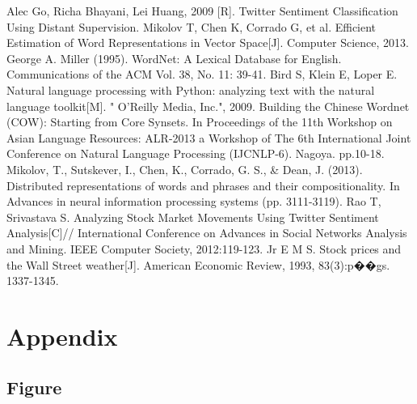 \documentclass[10pt, conference, compsocconf]{IEEEtran}
\begin{document}
\vspace{0.5cm}
\begin{thebibliography}{1}
Alec Go, Richa Bhayani, Lei Huang, 2009 [R]. Twitter Sentiment Classification Using Distant Supervision.\label{ref 1}
Mikolov T, Chen K, Corrado G, et al. Efficient Estimation of Word Representations in Vector Space[J]. Computer Science, 2013. \label{ref 2}
George A. Miller (1995). WordNet: A Lexical Database for English. Communications of the ACM Vol. 38, No. 11: 39-41.\label{ref 3}
Bird S, Klein E, Loper E. Natural language processing with Python: analyzing text with the natural language toolkit[M]. " O'Reilly Media, Inc.", 2009. \label{ref 4}
Building the Chinese Wordnet (COW): Starting from Core Synsets. In Proceedings of the 11th Workshop on Asian Language Resources: ALR-2013 a Workshop of The 6th International Joint Conference on Natural Language Processing (IJCNLP-6). Nagoya. pp.10-18. \label{ref 5}
Mikolov, T., Sutskever, I., Chen, K., Corrado, G. S., \& Dean, J. (2013). Distributed representations of words and phrases and their compositionality. In Advances in neural information processing systems (pp. 3111-3119). \label{ref 6}
Rao T, Srivastava S. Analyzing Stock Market Movements Using Twitter Sentiment Analysis[C]// International Conference on Advances in Social Networks Analysis and Mining. IEEE Computer Society, 2012:119-123. \label{ref 7}
Jr E M S. Stock prices and the Wall Street weather[J]. American Economic Review, 1993, 83(3):p��gs. 1337-1345. \label{ref 8}
\end{thebibliography}

\section{Appendix}
\subsection{Figure}

\newpage
\end{document}
